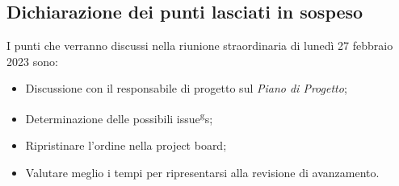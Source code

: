 \subsection{Dichiarazione dei punti lasciati in sospeso}
 I punti che verranno discussi nella riunione straordinaria di lunedì 27 febbraio 2023 sono:
 \begin{itemize}
    \item Discussione con il responsabile di progetto sul \textit{Piano di Progetto};
    \item Determinazione delle possibili issue\textsuperscript{g}s;
    \item Ripristinare l'ordine nella project board;
    \item Valutare meglio i tempi per ripresentarsi alla revisione di avanzamento.
 \end{itemize}
